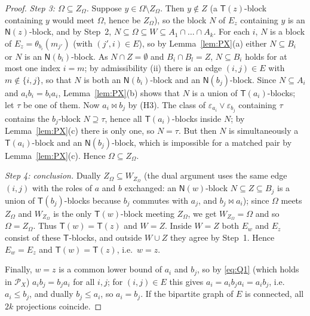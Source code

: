 \documentclass[11pt]{amsart}
\theoremstyle{definition}
\renewcommand{\P}{\mathcal{P}}
\newcommand{\T}{\mathsf{T}}
\newcommand{\N}{\mathsf{N}}
\begin{document}
\begin{proof}
\emph{Step 3: $\Omega\subseteq Z_\Omega$.} Suppose $y\in\Omega\setminus Z_\Omega$. Then $y\notin Z$ (a $\T(z)$-block containing $y$ would meet $\Omega$, hence be $Z_\Omega$), so the block $N$ of $E_z$ containing $y$ is an $\N(z)$-block, and by Step~2, $N\subseteq\Omega\subseteq W\subseteq A_1\cap\dots\cap A_k$. For each $i$, $N$ is a block of $E_z=\theta_{b_i}(m_{j'})$ (with $(j',i)\in E$), so by Lemma~\ref{lem:PX}(a) either $N\subseteq B_i$ or $N$ is an $\N(b_i)$-block. As $N\cap Z=\emptyset$ and $B_i\cap B_l=Z$, $N\subseteq B_i$ holds for at most one index $i=m$; by admissibility (ii) there is an edge $(i,j)\in E$ with $m\notin\{i,j\}$, so that $N$ is both an $\N(b_i)$-block and an $\N(b_j)$-block. Since $N\subseteq A_i$ and $a_ib_i=b_ia_i$, Lemma~\ref{lem:PX}(b) shows that $N$ is a union of $\T(a_i)$-blocks; let $\tau$ be one of them. Now $a_i\bowtie b_j$ by (H3). The class of $\varepsilon_{a_i}\vee\varepsilon_{b_j}$ containing $\tau$ contains the $b_j$-block $N\supseteq\tau$, hence all $\T(a_i)$-blocks inside $N$; by Lemma~\ref{lem:PX}(c) there is only one, so $N=\tau$. But then $N$ is simultaneously a $\T(a_i)$-block and an $\N(b_j)$-block, which is impossible for a matched pair by Lemma~\ref{lem:PX}(c). Hence $\Omega\subseteq Z_\Omega$.

\emph{Step 4: conclusion.} Dually $Z_\Omega\subseteq W_{Z_\Omega}$ (the dual argument uses the same edge $(i,j)$ with the roles of $a$ and $b$ exchanged: an $\N(w)$-block $N\subseteq Z\subseteq B_j$ is a union of $\T(b_j)$-blocks because $b_j$ commutes with $a_j$, and $b_j\bowtie a_i$); since $\Omega$ meets $Z_\Omega$ and $W_{Z_\Omega}$ is the only $\T(w)$-block meeting $Z_\Omega$, we get $W_{Z_\Omega}=\Omega$ and so $\Omega=Z_\Omega$. Thus $\T(w)=\T(z)$ and $W=Z$. Inside $W=Z$ both $E_w$ and $E_z$ consist of these $\T$-blocks, and outside $W\cup Z$ they agree by Step~1. Hence $E_w=E_z$ and $\T(w)=\T(z)$, i.e.\ $w=z$.

Finally, $w=z$ is a common lower bound of $a_i$ and $b_j$, so by \eqref{eq:Q1} (which holds in $\P_X$) $a_ib_j=b_ja_i$ for all $i,j$; for $(i,j)\in E$ this gives $a_i=a_ib_ja_i=a_ib_j$, i.e.\ $a_i\le b_j$, and dually $b_j\le a_i$, so $a_i=b_j$. If the bipartite graph of $E$ is connected, all $2k$ projections coincide.
\end{proof}
\end{document}
